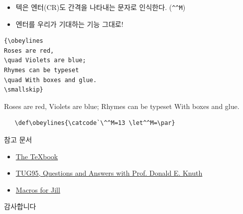 \documentclass{beamer}
\begin{document}
%
\begin{frame}[fragile]{\texttt{\string\obeylines}}
  \begin{itemize}
  \item 텍은 엔터(CR)도 간격을 나타내는 문자로 인식한다. (\verb+^^M+)%
  \item 엔터를 우리가 기대하는 기능 그대로! 
  \end{itemize}

  \begin{table}[ht]
  \begin{minipage}[t]{.4\textwidth}
  \begin{Verbatim}[fontsize=\small]
{\obeylines
Roses are red,
\quad Violets are blue;
Rhymes can be typeset
\quad With boxes and glue.
\smallskip}
  \end{Verbatim}
  \end{minipage}%
  \qquad\qquad
  \begin{minipage}[t]{.4\linewidth}
    {\obeylines
      Roses are red,
      \quad Violets are blue;
      Rhymes can be typeset
      \quad With boxes and glue.
      \smallskip}
  \end{minipage}
  \end{table}
  
  \begin{Verbatim}
   \def\obeylines{\catcode`\^^M=13 \let^^M=\par}
  \end{Verbatim}
\end{frame}


%
\begin{frame}{참고 문서}
  \begin{itemize}
  \item \href{http://ftp.ktug.org/tex-archive/systems/knuth/dist/tex/}
    {The \TeX book}
  \item \href{https://tug.org/TUGboat/tb17-1/tb50knut.pdf}
    {TUG95, Questions and Answers with Prof. Donald E. Knuth}
  \item \href{https://www.tug.org/TUGboat/tb08-3/tb19knut.pdf}
    {Macros for Jill}
  \end{itemize}
\end{frame}


%
\begin{frame}[standout]
  감사합니다
\end{frame}
\end{document}
